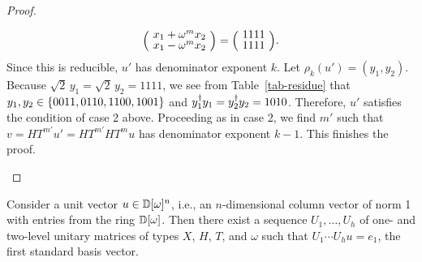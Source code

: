 \begin{proof}
\begin{itemize}
\[\begin{split}
        \zmatrix{c}{x_1+\omega^m x_2\\x_1-\omega^m x_2} =
        \zmatrix{c}{1111\\1111}.
      \end{split}
    \]
    Since this is reducible, $u'$ has denominator exponent $k$. Let $\rho_k(u')=(y_1,y_2)$. Because
    $\sqrt{2}\,y_1=\sqrt{2}\,y_2=1111$, we see from Table~\ref{tab-residue} that
    $y_1,y_2\in\{0011,0110,1100,1001\}$ and $y_1^{\dagger} y_1=y_2^{\dagger} y_2=1010$. Therefore, $u'$ satisfies
    the condition of case 2 above. Proceeding as in case 2, we find $m'$ such that $v=HT^{m'}
    u'=HT^{m'} HT^mu$ has denominator exponent $k-1$. This finishes the proof.\qedhere
  \end{itemize}
\end{proof}

\begin{lemma}\label{lem-column}
  Consider a unit vector $u\in\mathbb{D}[\omega]^n$, i.e., an $n$-dimensional column vector of norm 1 with entries
  from the ring $\mathbb{D}[\omega]$. Then there exist a sequence $U_1,\ldots,U_h$ of one- and two-level unitary
  matrices of types $X$, $H$, $T$, and $\omega$ such that $U_1\cdots U_hu = e_1$, the first
  standard basis vector.
\end{lemma}

